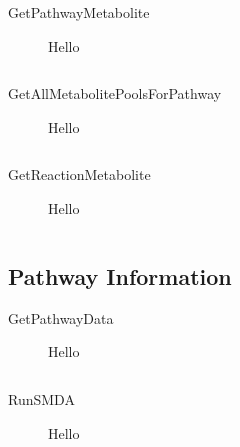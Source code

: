 \begin{description}
    \item[GetPathwayMetabolite] Hello

    \begin{lstlisting}
    \end{lstlisting}

    \item[GetAllMetabolitePoolsForPathway] Hello

    \begin{lstlisting}
    \end{lstlisting}

    \item[GetReactionMetabolite] Hello

    \begin{lstlisting}
    \end{lstlisting}

\end{description}

\subsection{Pathway Information}
\begin{description}

    \item[GetPathwayData] Hello

    \begin{lstlisting}
    \end{lstlisting}

    \item[RunSMDA] Hello

    \begin{lstlisting}
    \end{lstlisting}

\end{description}
